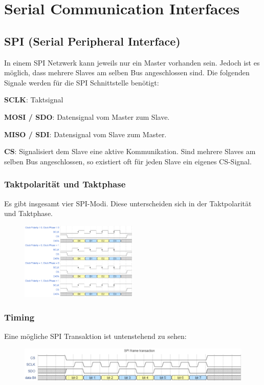 \section{Serial Communication Interfaces}
\subsection{SPI (Serial Peripheral Interface)}
In einem SPI Netzwerk kann jeweils nur ein Master vorhanden sein. Jedoch ist es möglich, dass mehrere Slaves am selben Bus angeschlossen sind. Die folgenden Signale werden für die SPI Schnittstelle benötigt:
\begin{compactitem}
    \item \textbf{SCLK}: Taktsignal
    \item \textbf{MOSI / SDO}: Datensignal vom Master zum Slave.
    \item \textbf{MISO / SDI}: Datensignal vom Slave zum Master.
    \item \textbf{CS}: Signalisiert dem Slave eine aktive Kommunikation. Sind mehrere Slaves am selben Bus angeschlossen, so existiert oft für jeden Slave ein eigenes CS-Signal.
\end{compactitem}

\subsubsection{Taktpolarität und Taktphase}
Es gibt insgesamt vier SPI-Modi. Diese unterscheiden sich in der Taktpolarität und Taktphase.
\begin{figure}[H]
    \includegraphics[width=0.5\textwidth]{images/spi_taktphase.png}
\end{figure}

\subsubsection{Timing}
Eine mögliche SPI Transaktion ist untenstehend zu sehen:
\begin{figure}[H]
    \includegraphics[width=1\textwidth]{images/spi_timing.png}
\end{figure}

